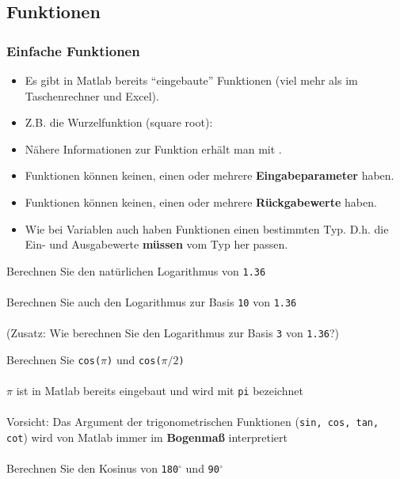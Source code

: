     \subsection{Funktionen}
    \begin{frame}
        \frametitle{Einfache Funktionen}
        \begin{itemize}
          \item Es gibt in Matlab bereits ``eingebaute'' Funktionen (viel mehr als im Taschenrechner und Excel).
          \item Z.B. die Wurzelfunktion (square root): 
          \item Nähere Informationen zur Funktion  erhält man mit .
          \item Funktionen können keinen, einen oder mehrere \textbf{Eingabeparameter} haben.
          \item Funktionen können keinen, einen oder mehrere \textbf{Rückgabewerte} haben.
          \item Wie bei Variablen auch haben Funktionen einen bestimmten Typ. D.h. die Ein- und Ausgabewerte \textbf{müssen} vom Typ her passen.
        \end{itemize}
      \end{frame}

      \secMexercise
      \begin{frame}
        \frameMexercise
        \begin{exercise}
            \sloppy
            Berechnen Sie den natürlichen Logarithmus von \texttt{1.36} \\ \\
            Berechnen Sie auch den Logarithmus zur Basis \texttt{10} von \texttt{1.36} \\ \\
            (Zusatz: Wie berechnen Sie den Logarithmus zur Basis \texttt{3} von \texttt{1.36}?)
        \end{exercise}
    \end{frame}

    \secMexercise
    \begin{frame}
      \frameMexercise
      \begin{exercise}
          \sloppy
          Berechnen Sie \texttt{cos($\pi$)} und \texttt{cos($\pi / 2$)} \\ \\
          $\pi$ ist in Matlab bereits eingebaut und wird mit \texttt{pi} bezeichnet \\ \\
          \alert{Vorsicht}: Das Argument der trigonometrischen Funktionen (\texttt{sin, cos, tan, cot}) wird von Matlab immer im \textbf{Bogenmaß} interpretiert \\ \\
          Berechnen Sie den Kosinus von \texttt{180$^{\circ}$} und \texttt{90$^{\circ}$}
      \end{exercise}
    \end{frame}

